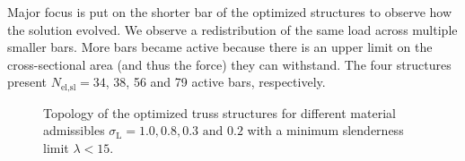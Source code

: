 Major focus is put on the shorter bar of the optimized structures to observe how the solution evolved. We observe a redistribution of the same load across multiple smaller bars. More bars became active because there is an upper limit on the cross-sectional area (and thus the force) they can withstand. The four structures present $N_\text{el,sl}=34$, 38, 56 and 79 active bars, respectively.

\begin{figure}[]
    \hfill
    \hfill
    \hfill
    \caption{Topology of the optimized truss structures for different material admissibles $\sigma_\text{L}=1.0,0.8,0.3\text{ and }0.2$ with a minimum slenderness limit $\lambda<15$.}
    \label{fig:04_tto_slend}
\end{figure}

